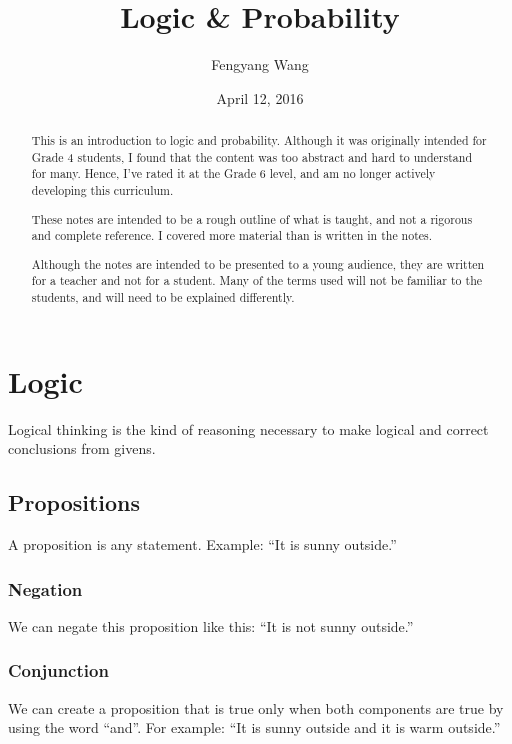 \documentclass[a4paper,10pt]{report}
\title{Logic \& Probability}
\author{Fengyang Wang}
\date{April 12, 2016}
\begin{document}
\begin{abstract}

 This is an introduction to logic and probability. Although it was originally
 intended for Grade 4 students, I found that the content was too abstract and
 hard to understand for many. Hence, I've rated it at the Grade 6 level, and am
 no longer actively developing this curriculum.

 These notes are intended to be a rough outline of what is taught, and not a
 rigorous and complete reference. I covered more material than is written in the
 notes.

 Although the notes are intended to be presented to a young audience, they are
 written for a teacher and not for a student. Many of the terms used will not be
 familiar to the students, and will need to be explained differently.

\end{abstract}

\maketitle

\tableofcontents

\chapter{Logic}

Logical thinking is the kind of reasoning necessary to make logical and correct
conclusions from givens.

\section{Propositions}

A proposition is any statement. Example: ``It is sunny outside.''

\subsection{Negation}

We can negate this proposition like this: ``It is not sunny outside.''

\subsection{Conjunction}

We can create a proposition that is true only when both components are true by
using the word ``and''. For example: ``It is sunny outside and it is warm
outside.''
\end{document}

